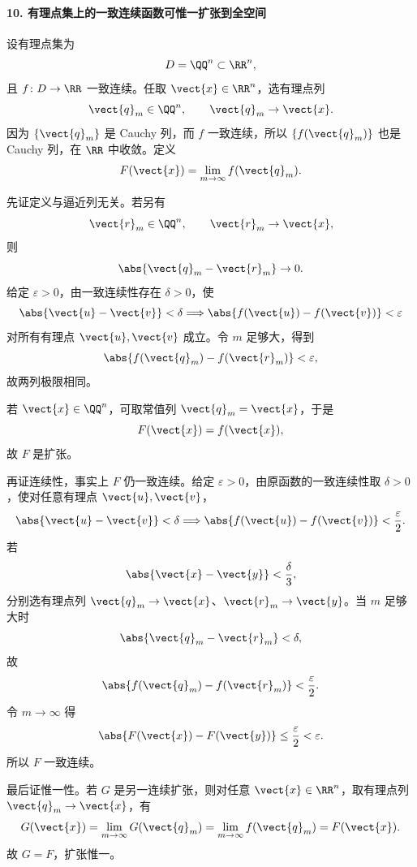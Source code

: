 \paragraph{10. 有理点集上的一致连续函数可惟一扩张到全空间}
\begin{xsolution}
设有理点集为
\[
  D=\QQ^n\subset\RR^n,
\]
且 $f\colon D\to\RR$ 一致连续。任取 $\vect{x}\in\RR^n$，选有理点列
\[
  \vect{q}_m\in\QQ^n,
  \qquad
  \vect{q}_m\to\vect{x}.
\]
因为 $\{\vect{q}_m\}$ 是 Cauchy 列，而 $f$ 一致连续，所以 $\{f(\vect{q}_m)\}$ 也是 Cauchy 列，在 $\RR$ 中收敛。定义
\[
  F(\vect{x})=\lim_{m\to\infty}f(\vect{q}_m).
\]

先证定义与逼近列无关。若另有
\[
  \vect{r}_m\in\QQ^n,
  \qquad
  \vect{r}_m\to\vect{x},
\]
则
\[
  \abs{\vect{q}_m-\vect{r}_m}\to0.
\]
给定 $\varepsilon>0$，由一致连续性存在 $\delta>0$，使
\[
  \abs{\vect{u}-\vect{v}}<\delta
  \Longrightarrow
  \abs{f(\vect{u})-f(\vect{v})}<\varepsilon
\]
对所有有理点 $\vect{u},\vect{v}$ 成立。令 $m$ 足够大，得到
\[
  \abs{f(\vect{q}_m)-f(\vect{r}_m)}<\varepsilon,
\]
故两列极限相同。

若 $\vect{x}\in\QQ^n$，可取常值列 $\vect{q}_m=\vect{x}$，于是
\[
  F(\vect{x})=f(\vect{x}),
\]
故 $F$ 是扩张。

再证连续性，事实上 $F$ 仍一致连续。给定 $\varepsilon>0$，由原函数的一致连续性取 $\delta>0$，使对任意有理点 $\vect{u},\vect{v}$，
\[
  \abs{\vect{u}-\vect{v}}<\delta
  \Longrightarrow
  \abs{f(\vect{u})-f(\vect{v})}<\frac\varepsilon2.
\]
若
\[
  \abs{\vect{x}-\vect{y}}<\frac\delta3,
\]
分别选有理点列 $\vect{q}_m\to\vect{x}$、$\vect{r}_m\to\vect{y}$。当 $m$ 足够大时
\[
  \abs{\vect{q}_m-\vect{r}_m}<\delta,
\]
故
\[
  \abs{f(\vect{q}_m)-f(\vect{r}_m)}<\frac\varepsilon2.
\]
令 $m\to\infty$ 得
\[
  \abs{F(\vect{x})-F(\vect{y})}\le\frac\varepsilon2<\varepsilon.
\]
所以 $F$ 一致连续。

最后证惟一性。若 $G$ 是另一连续扩张，则对任意 $\vect{x}\in\RR^n$，取有理点列 $\vect{q}_m\to\vect{x}$，有
\[
  G(\vect{x})
  =\lim_{m\to\infty}G(\vect{q}_m)
  =\lim_{m\to\infty}f(\vect{q}_m)
  =F(\vect{x}).
\]
故 $G=F$，扩张惟一。
\end{xsolution}
